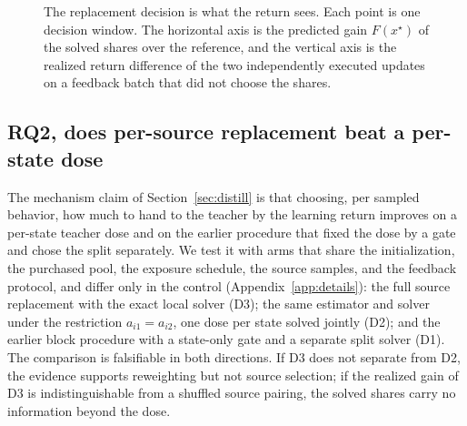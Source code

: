 \begin{figure}[t]
\centering
{}
\caption{The replacement decision is what the return sees. Each point
is one decision window. The horizontal axis is the predicted gain
$F(x^\star)$ of the solved shares over the reference, and the vertical
axis is the realized return difference of the two independently
executed updates on a feedback batch that did not choose the shares.}
\label{fig:mechanism}
\end{figure}

\subsection{RQ2, does per-source replacement beat a per-state dose}
\label{sec:rq2}
The mechanism claim of Section~\ref{sec:distill} is that choosing,
per sampled behavior, how much to hand to the teacher by the learning
return improves on a per-state teacher dose and on the earlier
procedure that fixed the dose by a gate and chose the split
separately. We test it with arms that share the initialization, the
purchased pool, the exposure schedule, the source samples, and the
feedback protocol, and differ only in the control
(Appendix~\ref{app:details}): the full source replacement with the
exact local solver (D3); the same estimator and solver under the
restriction $a_{i1}=a_{i2}$, one dose per state solved jointly (D2);
and the earlier block procedure with a state-only gate and a separate
split solver (D1).  The
comparison is falsifiable in both directions. If D3 does not separate
from D2, the evidence supports reweighting but not source selection;
if the realized gain of D3 is indistinguishable from a shuffled source
pairing, the solved shares carry no information beyond the dose.

